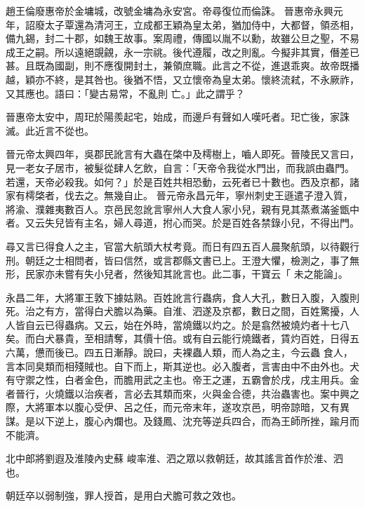 \begin{pinyinscope}
 趙王倫廢惠帝於金墉城，改號金墉為永安宮。帝尋復位而倫誅。
 晉惠帝永興元年，詔廢太子覃還為清河王，立成都王穎為皇太弟，猶加侍中，大都督，領丞相，備九錫，封二十郡，如魏王故事。案周禮，傳國以胤不以勳，故雖公旦之聖，不易成王之嗣。所以遠絕覬覦，永一宗祧。後代遵履，改之則亂。今擬非其實，僭差已甚。且既為國副，則不應復開封土，兼領庶職。此言之不從，進退乖爽。故帝既播越，穎亦不終，是其咎也。後猶不悟，又立懷帝為皇太弟。懷終流弒，不永厥祚，又其應也。語曰：「變古易常，不亂則
 亡。」此之謂乎？



 晉惠帝太安中，周𤣱於陽羨起宅，始成，而邊戶有聲如人嘆吒者。𤣱亡後，家誅滅。此近言不從也。



 晉元帝太興四年，吳郡民訛言有大蟲在棨中及樗樹上，嚙人即死。晉陵民又言曰，見一老女子居市，被髮從肆人乞飲，自言：「天帝令我從水門出，而我誤由蟲門。若還，天帝必殺我。如何？」於是百姓共相恐動，云死者已十數也。西及京都，諸家有樗棨者，伐去之。無幾自止。
 晉元帝永昌元年，寧州刺史王遜遣子澄入質，將渝、濮雜夷數百人。京邑民忽訛言寧州人大食人家小兒，親有見其蒸煮滿釜甑中者。又云失兒皆有主名，婦人尋道，拊心而哭。於是百姓各禁錄小兒，不得出門。



 尋又言已得食人之主，官當大航頭大杖考竟。而日有四五百人晨聚航頭，以待觀行刑。朝廷之士相問者，皆曰信然，或言郡縣文書已上。王澄大懼，檢測之，事了無形，民家亦未嘗有失小兒者，然後知其訛言也。此二事，干寶云「
 未之能論」。



 永昌二年，大將軍王敦下據姑熟。百姓訛言行蟲病，食人大孔，數日入腹，入腹則死。治之有方，當得白犬膽以為藥。自淮、泗遂及京都，數日之間，百姓驚擾，人人皆自云已得蟲病。又云，始在外時，當燒鐵以灼之。於是翕然被燒灼者十七八矣。而白犬暴貴，至相請奪，其價十倍。或有自云能行燒鐵者，賃灼百姓，日得五六萬，憊而後已。四五日漸靜。說曰，夫裸蟲人類，而人為之主，今云蟲
 食人，言本同臭類而相殘賊也。自下而上，斯其逆也。必入腹者，言害由中不由外也。犬有守禦之性，白者金色，而膽用武之主也。帝王之運，五霸會於戌，戌主用兵。金者晉行，火燒鐵以治疾者，言必去其類而來，火與金合德，共治蟲害也。案中興之際，大將軍本以腹心受伊、呂之任，而元帝末年，遂攻京邑，明帝諒暗，又有異謀。是以下逆上，腹心內爛也。及錢鳳、沈充等逆兵四合，而為王師所挫，踰月而不能濟。



 北中郎將劉遐及淮陵內史蘇
 峻率淮、泗之眾以救朝廷，故其謠言首作於淮、泗也。



 朝廷卒以弱制強，罪人授首，是用白犬膽可救之效也。




\end{pinyinscope}
